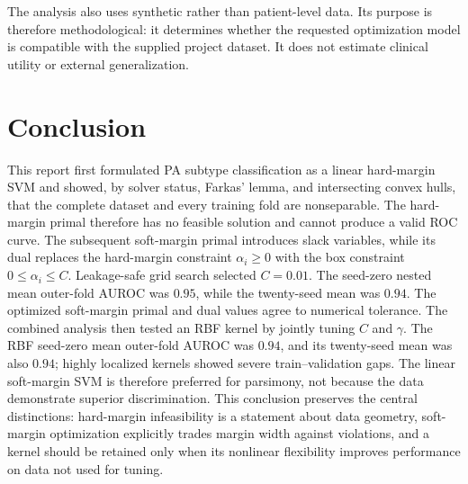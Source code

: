 \documentclass[11pt,a4paper]{article}
\numberwithin{equation}{section} %
\begin{document}
\begin{table}[htbp]
\centering
\caption{Baseline comparison across twenty split seeds. Seed SD and range
describe split sensitivity on the same synthetic cohort; they are not
independent-sample uncertainty intervals.}
\label{tab:baselines}

\end{table}

The analysis also uses synthetic rather than patient-level data. Its purpose is therefore methodological: it determines whether the requested optimization model is compatible with the supplied project dataset. It does not estimate clinical utility or external generalization.

\section{Conclusion}

This report first formulated PA subtype classification as a linear hard-margin
SVM and showed, by solver status, Farkas' lemma, and intersecting convex hulls,
that the complete dataset and every training fold are nonseparable. The
hard-margin primal therefore has no feasible solution and cannot produce a
valid ROC curve. The subsequent soft-margin primal introduces slack variables,
while its dual replaces the hard-margin constraint $\alpha_i\geq0$ with the
box constraint $0\leq\alpha_i\leq C$. Leakage-safe grid search selected
$C=0.01$. The seed-zero nested mean outer-fold AUROC was $0.95$, while the
twenty-seed mean was $0.94$.
The optimized
soft-margin primal and dual values agree to numerical tolerance. The combined
analysis then tested an RBF kernel by jointly tuning $C$ and $\gamma$. The RBF
seed-zero mean outer-fold AUROC was $0.94$, and its twenty-seed mean was also
$0.94$; highly localized kernels showed severe train--validation gaps. The
linear soft-margin SVM is therefore preferred for parsimony, not because the
data demonstrate superior discrimination. This conclusion
preserves the central distinctions: hard-margin infeasibility is a statement
about data geometry, soft-margin optimization explicitly trades margin width
against violations, and a kernel should be retained only when its nonlinear
flexibility improves performance on data not used for tuning.
\end{document}
